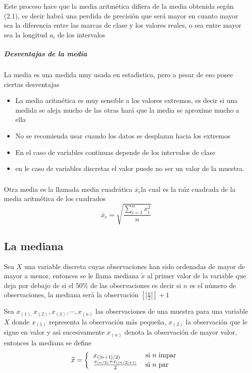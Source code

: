 Este proceso hace que la media aritm\'{e}tica difiera de la media obtenida
seg\'{u}n (2.1), es decir habr\'{a} una perdida de precisi\'{o}n que ser\'{a}
mayor en cuanto mayor sea la diferencia entre las marcas de clase y los
valores reales, o sea entre mayor sea la longitud $a_{i}$ de los intervalos\ \ \ \ \ \ \ \ \ \ \ \ \ \ \ \ \

\subparagraph{Desventajas de la media}

La media es una medida muy usa\-da en estad\'{\i}stica, pero a pesar de eso
posee ciertas desventajas

\begin{itemize}
\item La media aritm\'{e}tica es muy sensible a los valores extremos, es decir
si una medida se aleja mucho de las otras har\'{a} que la media se aproxime
mucho a ella

\item No se recomienda usar cuando los datos se desplazan hacia los extremos

\item En el caso de variables continuas depende de los intervalos de clase

\item en le caso de variables discretas el valor puede no ser un valor de la muestra.
\end{itemize}

\subsubsection{}

Otra media es la llamada media cuadr\'{a}tica $\overset{\_}{x}_{c}$la cual es
la ra\'{\i}z cuadrada de la media aritm\'{e}tica de los cuadrados
\[
\overset{\_}{x}_{c}=\sqrt{\frac{\sum_{i=1}^{n}x_{i}^{2}}{n}}%
\]

\subsection{La mediana}

Sea $X$ una variable discreta cuyas observaciones han sido ordenadas de mayor
de mayor a menor, entonces se le llama mediana $\widetilde{x}$ al primer valor
de la variable que deja por debajo de si el 50\% de las observaciones es decir
si $n$ es el n\'{u}mero de observaciones, la mediana ser\'{a} la
observaci\'{o}n $\left[  |\frac{n}{2}|\right]  +1$%

\begin{definition}
Sea $x_{(1),}x_{(2)},x_{(3)},\cdots,x_{(n)}$ las observaciones de una muestra
para una variable $X$ donde $x_{(1)}$ representa la observaci\'{o}n m\'{a}s
peque\~{n}a, $x_{(2)}$ la observaci\'{o}n que le sigue en valor y as\'{\i}
sucesivamente $x_{(n)}$ denota la observaci\'{o}n de mayor valor, entonces la
mediana se define \[ \widetilde{x}=\left\{
\begin{tabular}
[c]{ll}
$x_{([n+1]/2)}$ & si $n$ impar\\ $\frac{x_{(n/2)}+x_{([n/2]+1)}}{2}$ & si $n$
par
\end{tabular}
\right.  \]
\end{definition}

